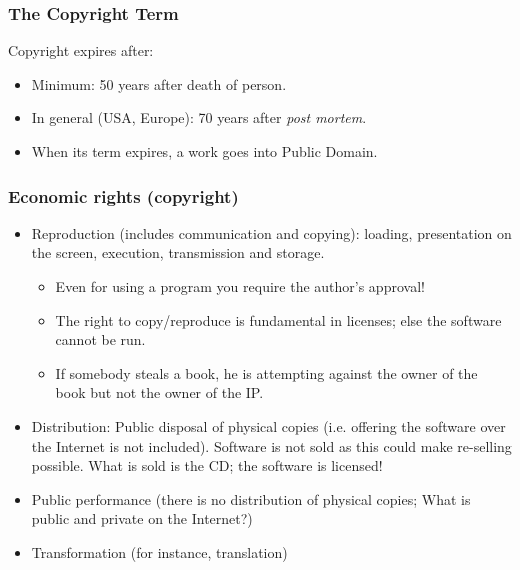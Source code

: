 
\begin{frame}
\frametitle{The Copyright Term}

Copyright expires after:

\begin{itemize}
\item Minimum: 50 years after death of person. 
\item In general (USA, Europe): 70 years after \textit{post mortem}.
\item When its term expires, a work goes into Public Domain.

\end{itemize}

\end{frame}


\begin{frame}
\frametitle{Economic rights (copyright)}

\begin{itemize}
\item Reproduction (includes communication and copying): loading,
presentation on the screen, execution, transmission and storage.
\begin{itemize}
\item Even for using a program you require the author's approval!
\item The right to copy/reproduce is fundamental in licenses; else
the software cannot be run.
\item If somebody steals a book, he is attempting against the owner
of the book but not the owner of the IP. 
\end{itemize}
\item Distribution: Public disposal of physical copies (i.e. offering
the software over the Internet is not included). Software is not
sold as this could make re-selling possible. What is sold is the CD; the
software is licensed!
\item Public performance (there is no distribution of physical copies; What is public and private
on the Internet?)
\item Transformation (for instance, translation)
\end{itemize}


\end{frame}




